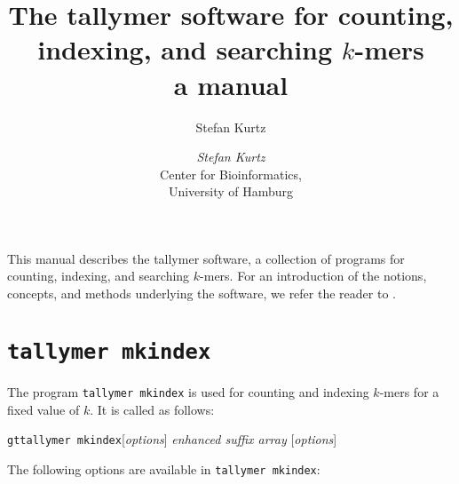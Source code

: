 \documentclass[12pt]{article}
\title{The tallymer software for counting, indexing, and searching $k$-mers\\
a manual}
\author{Stefan Kurtz}
\author{\begin{tabular}{c}
         \emph{Stefan Kurtz}\\
         Center for Bioinformatics,\\
         University of Hamburg
        \end{tabular}}
\newcommand{\Programname}[1]{\texttt{#1}}
\newcommand{\TYmkindex}[0]{\Programname{tallymer mkindex}\xspace}
\newcommand{\GT}[0]{\Programname{gt}\xspace}
\begin{document}
\maketitle
This manual describes the tallymer software, a collection of programs
for  counting, indexing, and searching $k$-mers. For an introduction of
the notions, concepts, and methods underlying the software, we refer
the reader to \cite{KUR:NER:STE:WAR:2008}.

\section{\TYmkindex}

The program \TYmkindex is used for counting and indexing \(k\)-mers for
a fixed value of \(k\). It is called as follows:
\par
\noindent\GT \TYmkindex [\emph{options}]  \emph{enhanced suffix
array} [\emph{options}]
\par
The following options are available in \TYmkindex:
\end{document}
